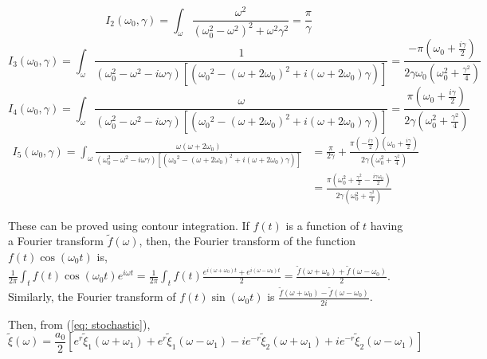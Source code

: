 \documentclass[12pt, twoside]{article}
\begin{document}
\begin{equation}
I_2(\omega_0,\gamma) = \int_{\omega} \frac{\omega^2}{(\omega_0^2 - \omega^2)^2 + \omega^2 \gamma^2} = \frac{\pi}{\gamma}
\end{equation} 
\begin{equation}
I_3(\omega_0,\gamma) = \int_{\omega} \frac{1}{(\omega_0^2 - \omega^2 - i\omega\gamma) [({\omega_0}^2 - (\omega + 2\omega_0)^2 + i(\omega + 2 \omega_0) \gamma)]} = \frac{-\pi(\omega_0 + \frac{i\gamma}{2})}{2\gamma\omega_0(\omega_0^2 + \frac{\gamma^2}{4})}
\end{equation}
\begin{equation}
I_4(\omega_0,\gamma) = \int_{\omega} \frac{\omega}{(\omega_0^2 - \omega^2 - i\omega\gamma) [({\omega_0}^2 - (\omega + 2\omega_0)^2 + i(\omega + 2 \omega_0) \gamma)]} = \frac{\pi(\omega_0 + \frac{i\gamma}{2})}{2\gamma(\omega_0^2 + \frac{\gamma^2}{4})}
\end{equation}
\begin{equation}\begin{aligned}
I_5(\omega_0,\gamma) = \int_{\omega} \frac{\omega (\omega + 2\omega_0)}{(\omega_0^2 - \omega^2 - i\omega\gamma) [({\omega_0}^2 - (\omega + 2\omega_0)^2 + i(\omega + 2 \omega_0) \gamma)]} &= \frac{\pi}{2\gamma} + \frac{\pi(-\frac{i\gamma}{2})(\omega_0 + \frac{i\gamma}{2})}{2\gamma(\omega_0^2 + \frac{\gamma^2}{4})} \\&= \frac{\pi(\omega_0^2 + \frac{\gamma^2}{2} -\frac{i\gamma\omega_0}{2})}{2\gamma(\omega_0^2 + \frac{\gamma^2}{4})}\end{aligned}
\end{equation}

These can be proved using contour integration. If $f(t)$ is a function of $t$ having a Fourier transform $\widetilde{f}(\omega)$, then, the Fourier transform of the function $f(t)\cos(\omega_0 t)$ is, $\frac{1}{2\pi} \int_{t} f(t) \cos(\omega_0 t) e^{i\omega t} = \frac{1}{2\pi} \int_{t} f(t) \frac{e^{i(\omega+\omega_0) t} + e^{i(\omega-\omega_0) t}}{2} = \frac{\widetilde{f}(\omega + \omega_0) + \widetilde{f}(\omega - \omega_0)}{2}$. Similarly, the Fourier transform of $f(t)\sin(\omega_0 t)$ is $\frac{\widetilde{f}(\omega + \omega_0) - \widetilde{f}(\omega - \omega_0)}{2i}$.

Then, from (\ref{eq: stochastic}),
\begin{equation}\label{eq:fourier_stochastic}
	\widetilde{\xi}(\omega) = \frac{a_0}{2} [e^r \widetilde{\xi}_1 (\omega + \omega_1) + e^r \widetilde{\xi}_1 (\omega - \omega_1) - i e^{-r} \widetilde{\xi}_2 (\omega + \omega_1) +  i e^{-r} \widetilde{\xi}_2 (\omega - \omega_1)]
\end{equation}
\end{document}
